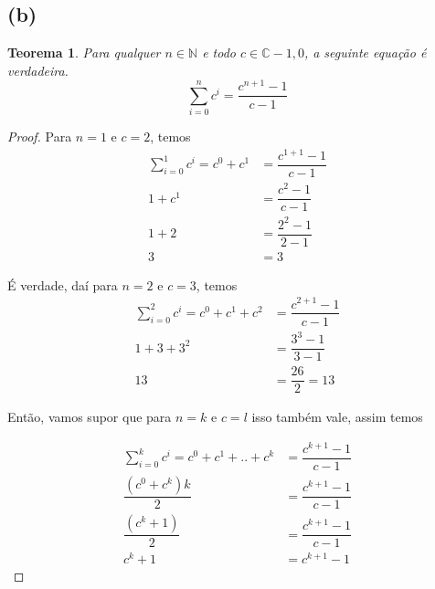 \documentclass{article}
\begin{document}
\subsection*{(b)}
\newtheorem{teo2}{Teorema}
\begin{teo2}
    Para qualquer $n \in  \mathbb{N}$ e todo $c \in \mathbb{C} - {1,0}$,
    a seguinte equação é verdadeira.
	\begin{equation}
		\sum\limits_{i=0}^{n} c^i = \dfrac{c^{n+1} - 1}{c - 1}
	\end{equation}	
\end{teo2}
\begin{proof}
	Para $n = 1$ e $c = 2$, temos
	\begin{equation}
	\begin{split}
		\sum\limits_{i=0}^{1} c^i = c^0 + c^1 & = \dfrac{c^{1+1} - 1}{c - 1} \\
		1 + c^1 & = \dfrac{c^2 - 1}{c - 1} \\ 
		1 + 2 & = \dfrac{2^2 - 1}{2 - 1} \\
		3 & = 3
	\end{split}
	\end{equation}

	É verdade, daí para $n = 2$ e $c = 3$, temos
	\begin{equation}
	\begin{split}
		\sum\limits_{i=0}^{2} c^i = c^0 + c^1 + c^2 & = \dfrac{c^{2+1} - 1}{c - 1} \\
		1 + 3 + 3^2 & = \dfrac{ 3^3 - 1}{3 - 1}\\
		13 & = \dfrac{26}{2} = 13
	\end{split}
	\end{equation}

	Então, vamos supor que para $n = k$ e $c = l$ isso também vale, assim temos

	\begin{equation}
		\begin{split}
		\sum\limits_{i=0}^{k} c^i = c^0 + c^1 + .. + c^k & = \dfrac{c^{k+1} - 1}{c - 1} \\
		\dfrac{(c^0+c^k)k}{2} & = \dfrac{c^{k+1} - 1}{c - 1} \\
		\dfrac{(c^k + 1)}{2} & = \dfrac{c^{k+1} - 1}{c - 1}\\
		c^k + 1 & = c^{k+1} - 1
		\end{split}
	\end{equation}
\end{proof}
\end{document}
